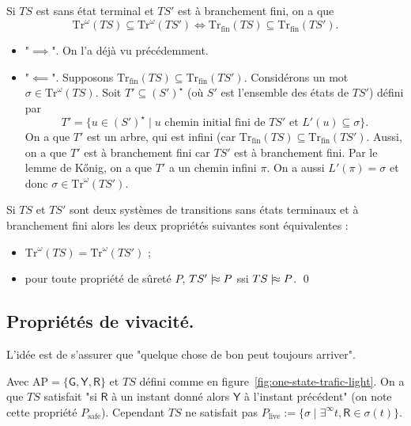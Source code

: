 \documentclass[./main]{subfiles}
\begin{document}
  \begin{prop}
    Si $TS$ est sans état terminal et $TS'$ est à branchement fini, on a que
    \[
    \mathrm{Tr}^\omega(TS) \subseteq \mathrm{Tr}^\omega(TS') \iff
    \mathrm{Tr}_\mathrm{fin}(TS) \subseteq \mathrm{Tr}_\mathrm{fin}(TS')
    .\]
  \end{prop}
  \begin{prv}
    \begin{itemize}
      \item "$\implies$". On l'a déjà vu précédemment.
      \item "$\impliedby$". Supposons $\mathrm{Tr}_\mathrm{fin}(TS) \subseteq \mathrm{Tr}_\mathrm{fin}(TS')$.
        Considérons un mot $\sigma \in \mathrm{Tr}^\omega(TS)$.
        Soit $T' \subseteq (S')^\star$ (où $S'$ est l'ensemble des états de $TS'$) défini par 
        \[
        T' = \{u \in (S')^\star  \mid u \text{ chemin initial fini de } TS' \text{ et } L'(u) \subseteq \sigma \} 
        .\]
        On a que $T'$ est un arbre, qui est infini (car $\mathrm{Tr}_\mathrm{fin}(TS) \subseteq \mathrm{Tr}_\mathrm{fin}(TS')$.
        Aussi, on a que $T'$ est à branchement fini car $TS'$ est à branchement fini.
        Par le lemme de Kőnig, on a que $T'$ a un chemin infini $\pi$.
        On a aussi $L'(\pi) = \sigma$ et donc $\sigma \in \mathrm{Tr}^\omega(TS')$.
    \end{itemize}
  \end{prv}

  \begin{crlr}
    Si $TS$ et $TS'$ sont deux systèmes de transitions sans états terminaux et à branchement fini alors les deux propriétés suivantes sont équivalentes :
    \begin{itemize}
      \item $\mathrm{Tr}^\omega(TS) = \mathrm{Tr}^\omega(TS')$ ;
      \item pour toute propriété de sûreté $P$, $TS' \mathrel{{|}\!{\approx}} P$ ssi $TS \mathrel{{|}\!{\approx}} P$.
      \qed
    \end{itemize}
  \end{crlr}

  \subsection{Propriétés de vivacité.}

  L'idée est de s'assurer que "quelque chose de bon peut toujours arriver".

  \begin{exm}
    Avec $\mathrm{AP} = \{\mathsf{G}, \mathsf{Y}, \mathsf{R}\} $ et $TS$ défini comme en figure~\ref{fig:one-state-trafic-light}.
    On a que $TS$ satisfait "si $\mathsf{R}$ à un instant donné alors $\mathsf{Y}$ à l'instant précédent" (on note cette propriété $P_\mathrm{safe}$).
    Cependant $TS$ ne satisfait pas $P_\mathrm{live} := \{\sigma  \mid \exists^\infty t, \mathsf{R} \in \sigma(t)\}$.
  \end{exm}
\end{document}
